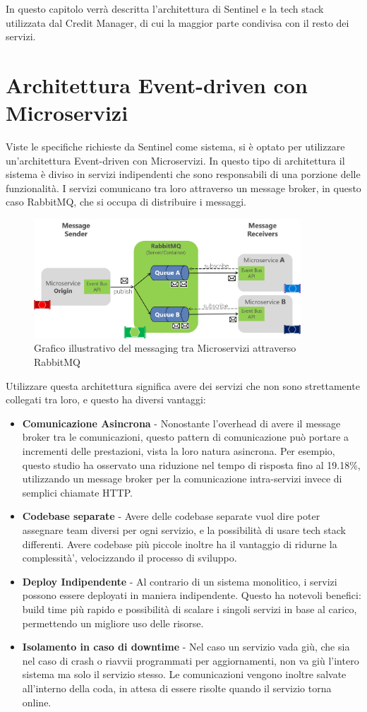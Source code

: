 In questo capitolo verr\`a descritta l'architettura di Sentinel e la tech stack utilizzata dal Credit Manager, di cui la maggior parte condivisa con il resto dei servizi.

\section{Architettura Event-driven con Microservizi}
Viste le specifiche richieste da Sentinel come sistema, si \`e optato per utilizzare un'architettura Event-driven con Microservizi.
In questo tipo di architettura il sistema \`e diviso in servizi indipendenti che sono responsabili di una porzione delle funzionalit\`a.
I servizi comunicano tra loro attraverso un message broker, in questo caso RabbitMQ, che si occupa di distribuire i messaggi.
\begin{figure}[H]
  \centering
  \includegraphics[width=10cm]{images/architecture-example.png}
  \caption{Grafico illustrativo del messaging tra Microservizi attraverso RabbitMQ\cite{microsoftrabbitmq}}
\end{figure}
Utilizzare questa architettura significa avere dei servizi che non sono strettamente collegati tra loro, e questo ha diversi vantaggi:
\begin{itemize}
  \item \textbf{Comunicazione Asincrona} - Nonostante l'overhead di avere il message broker tra le comunicazioni, questo pattern di comunicazione pu\`o portare a incrementi delle prestazioni,
    vista la loro natura asincrona. Per esempio, questo studio\cite{eventdrivenperformance} ha osservato una riduzione nel tempo di risposta fino al 19.18\%, utilizzando un message broker per la comunicazione
    intra-servizi invece di semplici chiamate HTTP.
  \item \textbf{Codebase separate} - Avere delle codebase separate vuol dire poter assegnare team diversi per ogni servizio, e la possibilit\`a di usare tech stack differenti.
    Avere codebase pi\`u piccole inoltre ha il vantaggio di ridurne la complessit\`a', velocizzando il processo di sviluppo.
  \item \textbf{Deploy Indipendente} - Al contrario di un sistema monolitico, i servizi possono essere deployati in maniera indipendente.
    Questo ha notevoli benefici: build time pi\`u rapido e possibilit\`a di scalare i singoli servizi in base al carico, permettendo un migliore uso delle
    risorse.
  \item \textbf{Isolamento in caso di downtime} - Nel caso un servizio vada gi\`u, che sia nel caso di crash o riavvii programmati per aggiornamenti, non va gi\`u l'intero sistema
    ma solo il servizio stesso. Le comunicazioni vengono inoltre salvate all'interno della coda, in attesa di essere risolte quando il servizio torna online.
\end{itemize}
